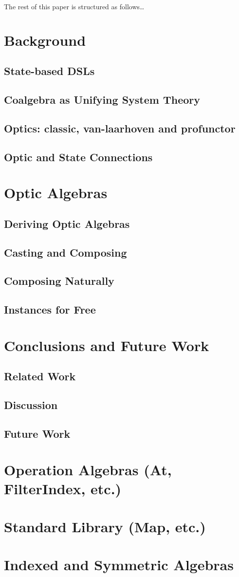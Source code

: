 \documentclass[a4paper]{report}
\begin{document}
The rest of this paper is structured as follows\ldots

\chapter{Background}
\section{State-based DSLs}
\section{Coalgebra as Unifying System Theory}
\section{Optics: classic, van-laarhoven and profunctor}
\section{Optic and State Connections}

\chapter{Optic Algebras}
\section{Deriving Optic Algebras}
\section{Casting and Composing}
\section{Composing Naturally}
\section{Instances for Free}

\chapter{Conclusions and Future Work}
\section{Related Work}
\section{Discussion}
\section{Future Work}

\begin{appendices}
\chapter{Operation Algebras (At, FilterIndex, etc.)}
\chapter{Standard Library (Map, etc.)}
\chapter{Indexed and Symmetric Algebras}
\end{appendices}
\end{document}
